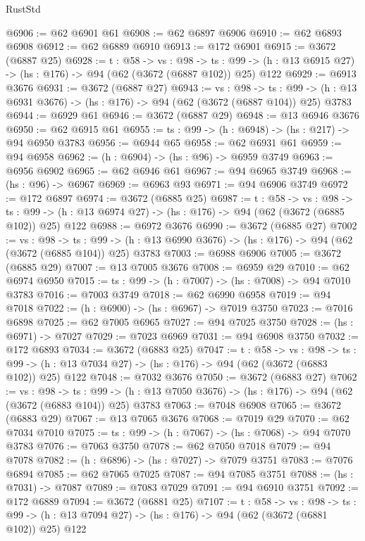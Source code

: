 \begin{lexlean}{RustStd}
\begin{coremodule}
@6906 := @62 @6901 @61
@6908 := @62 @6897 @6906
@6910 := @62 @6893 @6908
@6912 := @62 @6889 @6910
@6913 := @172 @6901
@6915 := @3672 (@6887 @25)
@6928 := {t : @58} ->
  {vs : @98} ->
  {ts : @99} -> (h : @13 @6915 @27) -> (hs : @176) -> @94 (@62 (@3672 (@6887 @102)) @25) @122
@6929 := @6913 @3676
@6931 := @3672 (@6887 @27)
@6943 := {vs : @98} ->
  {ts : @99} -> (h : @13 @6931 @3676) -> (hs : @176) -> @94 (@62 (@3672 (@6887 @104)) @25) @3783
@6944 := @6929 @61
@6946 := @3672 (@6887 @29)
@6948 := @13 @6946 @3676
@6950 := @62 @6915 @61
@6955 := {ts : @99} -> (h : @6948) -> (hs : @217) -> @94 @6950 @3783
@6956 := @6944 @65
@6958 := @62 @6931 @61
@6959 := @94 @6958
@6962 := (h : @6904) -> (hs : @96) -> @6959 @3749
@6963 := @6956 @6902
@6965 := @62 @6946 @61
@6967 := @94 @6965 @3749
@6968 := (hs : @96) -> @6967
@6969 := @6963 @93
@6971 := @94 @6906 @3749
@6972 := @172 @6897
@6974 := @3672 (@6885 @25)
@6987 := {t : @58} ->
  {vs : @98} ->
  {ts : @99} -> (h : @13 @6974 @27) -> (hs : @176) -> @94 (@62 (@3672 (@6885 @102)) @25) @122
@6988 := @6972 @3676
@6990 := @3672 (@6885 @27)
@7002 := {vs : @98} ->
  {ts : @99} -> (h : @13 @6990 @3676) -> (hs : @176) -> @94 (@62 (@3672 (@6885 @104)) @25) @3783
@7003 := @6988 @6906
@7005 := @3672 (@6885 @29)
@7007 := @13 @7005 @3676
@7008 := @6959 @29
@7010 := @62 @6974 @6950
@7015 := {ts : @99} -> (h : @7007) -> (hs : @7008) -> @94 @7010 @3783
@7016 := @7003 @3749
@7018 := @62 @6990 @6958
@7019 := @94 @7018
@7022 := (h : @6900) -> (hs : @6967) -> @7019 @3750
@7023 := @7016 @6898
@7025 := @62 @7005 @6965
@7027 := @94 @7025 @3750
@7028 := (hs : @6971) -> @7027
@7029 := @7023 @6969
@7031 := @94 @6908 @3750
@7032 := @172 @6893
@7034 := @3672 (@6883 @25)
@7047 := {t : @58} ->
  {vs : @98} ->
  {ts : @99} -> (h : @13 @7034 @27) -> (hs : @176) -> @94 (@62 (@3672 (@6883 @102)) @25) @122
@7048 := @7032 @3676
@7050 := @3672 (@6883 @27)
@7062 := {vs : @98} ->
  {ts : @99} -> (h : @13 @7050 @3676) -> (hs : @176) -> @94 (@62 (@3672 (@6883 @104)) @25) @3783
@7063 := @7048 @6908
@7065 := @3672 (@6883 @29)
@7067 := @13 @7065 @3676
@7068 := @7019 @29
@7070 := @62 @7034 @7010
@7075 := {ts : @99} -> (h : @7067) -> (hs : @7068) -> @94 @7070 @3783
@7076 := @7063 @3750
@7078 := @62 @7050 @7018
@7079 := @94 @7078
@7082 := (h : @6896) -> (hs : @7027) -> @7079 @3751
@7083 := @7076 @6894
@7085 := @62 @7065 @7025
@7087 := @94 @7085 @3751
@7088 := (hs : @7031) -> @7087
@7089 := @7083 @7029
@7091 := @94 @6910 @3751
@7092 := @172 @6889
@7094 := @3672 (@6881 @25)
@7107 := {t : @58} ->
  {vs : @98} ->
  {ts : @99} -> (h : @13 @7094 @27) -> (hs : @176) -> @94 (@62 (@3672 (@6881 @102)) @25) @122

\end{coremodule}
\end{lexlean}
